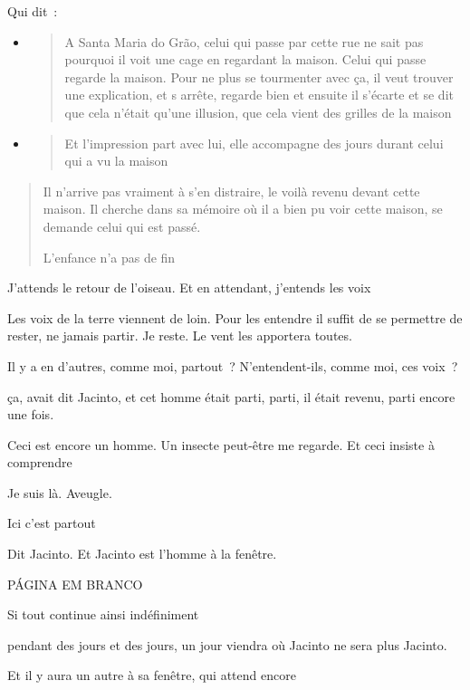 Qui dit~:

\begin{itemize}
\item
  \begin{quote}
  A Santa Maria do Grão, celui qui passe par cette rue ne sait pas
  pourquoi il voit une cage en regardant la maison. Celui qui passe
  regarde la maison. Pour ne plus se tourmenter avec ça, il veut trouver
  une explication, et s arrête, regarde bien et ensuite il s'écarte et
  se dit que cela n'était qu'une illusion, que cela vient des grilles de
  la maison
  \end{quote}
\item
  \begin{quote}
  Et l'impression part avec lui, elle accompagne des jours durant celui
  qui a vu la maison
  \end{quote}
\end{itemize}

\begin{quote}
Il n'arrive pas vraiment à s'en distraire, le voilà revenu devant cette
maison. Il cherche dans sa mémoire où il a bien pu voir cette maison, se
demande celui qui est passé.

L'enfance n'a pas de fin
\end{quote}

J'attends le retour de l'oiseau. Et en attendant, j'entends les voix

Les voix de la terre viennent de loin. Pour les entendre il suffit de se
permettre de rester, ne jamais partir. Je reste. Le vent les apportera
toutes.

Il y a en d'autres, comme moi, partout~? N'entendent-ils, comme moi, ces
voix~?

ça, avait dit Jacinto, et cet homme était parti, parti, il était revenu,
parti encore une fois.

Ceci est encore un homme. Un insecte peut-être me regarde. Et ceci
insiste à comprendre

Je suis là. Aveugle.

Ici c'est partout

Dit Jacinto. Et Jacinto est l'homme à la fenêtre.

PÁGINA EM BRANCO

Si tout continue ainsi indéfiniment

pendant des jours et des jours, un jour viendra où Jacinto ne sera plus
Jacinto.

Et il y aura un autre à sa fenêtre, qui attend encore

